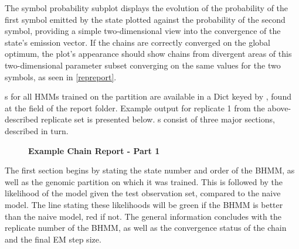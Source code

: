 \documentclass{ut-thesis}
\begin{document}
\begin{NoHyper}
The symbol probability subplot displays the evolution of the probability of the first symbol emitted by the state plotted against the probability of the second symbol, providing a simple two-dimensional view into the convergence of the state's emission vector. If the chains are correctly converged on the global optimum, the plot's appearance should show chains from divergent areas of this two-dimensional parameter subset converging on the same values for the two symbols, as seen in \autoref{repreport}.

s for all HMMs trained on the partition are available in a Dict keyed by , found at the  field of the report folder. Example output for replicate 1 from the above-described replicate set is presented below. s consist of three major sections, described in turn.

\begin{figure}[!h]
    \caption{{\bf Example \protect{} Chain Report - Part 1}}
    \label{chreport1}
\end{figure}

The first  section begins by stating the state number and order of the BHMM, as well as the genomic partition on which it was trained. This is followed by the likelihood of the model given the test observation set, compared to the naive model. The line stating these likelihoods will be green if the BHMM is better than the naive model, red if not. The general information concludes with the replicate number of the BHMM, as well as the convergence status of the chain and the final EM step size.


\end{NoHyper}
\end{document}
